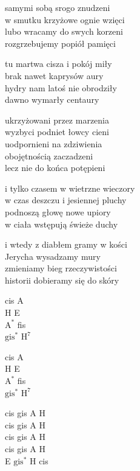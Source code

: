 \begin{text}
    samymi sobą srogo znudzeni\\
    w smutku krzyżowe ognie wzięci\\
    lubo wracamy do swych korzeni\\
    rozgrzebujemy popiół pamięci

    tu martwa cisza i pokój miły\\
    brak nawet kaprysów aury\\
    hydry nam latoś nie obrodziły\\
    dawno wymarły centaury

    \vin ukrzyżowani przez marzenia\\
    \vin wyzbyci podniet łowcy cieni\\
    \vin uodpornieni na zdziwienia\\
    \vin obojętnością zaczadzeni\\
    \vin lecz nie do końca potępieni

    i tylko czasem w wietrzne wieczory\\
    w czas deszczu i jesiennej pluchy\\
    podnoszą głowę nowe upiory\\
    w ciała wstępują świeże duchy

    i wtedy z diabłem gramy w kości\\
    Jerycha wysadzamy mury\\
    zmieniamy bieg rzeczywistości\\
    historii dobieramy się do skóry
\end{text}
\begin{chord}
    cis A\\
    H E\\
    $\mathrm{A^{*}}$ fis\\
    $\mathrm{gis^{*}}$ $\mathrm{H^{7}}$

    cis A\\
    H E\\
    $\mathrm{A^{*}}$ fis\\
    $\mathrm{gis^{*}}$ $\mathrm{H^{7}}$

    cis gis A H\\
    cis gis A H\\
    cis gis A H\\
    cis gis A H\\
    E $\mathrm{gis^{*}}$ H cis

\end{chord}

